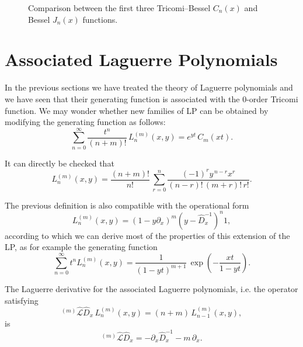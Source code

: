 \begin{figure}[h]
\centering
\setlength{\fboxsep}{6pt}
\caption{Comparison between the first three Tricomi--Bessel $C_n(x)$ and
Bessel $J_n(x)$ functions.}
\label{fig:4.5}
\end{figure}

\section{Associated Laguerre Polynomials}

In the previous sections we have treated the theory of Laguerre
polynomials and we have seen that their generating function is associated
with the 0-order Tricomi function. We may wonder whether new families
of LP can be obtained by modifying the generating function as follows:
\begin{equation}
\sum_{n=0}^{\infty} \frac{t^n}{(n+m)!}\,L_n^{(m)}(x,y)
= e^{yt}\,C_m(xt).
\label{eq:4.5.1}
\end{equation}

It can directly be checked that
\begin{equation}
L_n^{(m)}(x,y)
= \frac{(n+m)!}{n!}\,
\sum_{r=0}^{n} \frac{(-1)^r y^{\,n-r} x^r}{(n-r)!\,(m+r)!\,r!}.
\label{eq:4.5.2}
\end{equation}

The previous definition is also compatible with the operational form
\begin{equation}
L_n^{(m)}(x,y)
= (1 - y\partial_x)^m (y - \hat D_x^{-1})^n 1,
\label{eq:4.5.3}
\end{equation}
according to which we can derive most of the properties of this extension of
the LP, as for example the generating function
\begin{equation}
\sum_{n=0}^{\infty} t^n L_n^{(m)}(x,y)
= \frac{1}{(1-yt)^{m+1}}\,\exp\!\left(-\frac{xt}{1-yt}\right).
\label{eq:4.5.4}
\end{equation}

The Laguerre derivative for the associated Laguerre polynomials,
i.e. the operator satisfying
\begin{equation}
{}^{(m)}\!\hat{\mathcal L}\!\hat D_x\,
L_n^{(m)}(x,y) = (n+m)\,L_{n-1}^{(m)}(x,y),
\label{eq:4.5.5}
\end{equation}
is
\begin{equation}
{}^{(m)}\!\hat{\mathcal L}\!\hat D_x
= -\partial_x \hat D_x^{-1} - m\,\partial_x.
\label{eq:4.5.6}
\end{equation}

